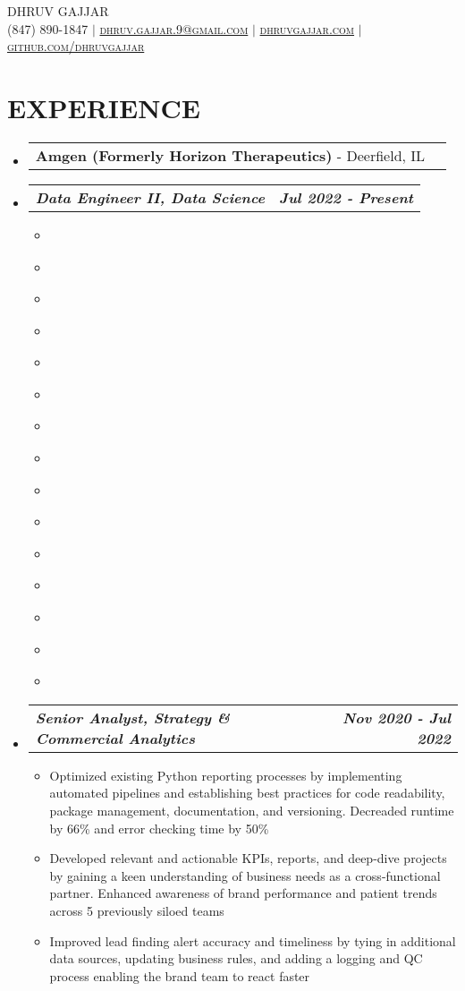 \documentclass[letterpaper,11pt]{article}
\makeatletter
\newcommand{\resumeItem}[1]{
  \item\small{
    {#1 \vspace{-2pt}}
  }
}
\newcommand{\resumeSubheading}[2]{
  \vspace{-2pt}\item
    \begin{tabular*}{0.97\textwidth}[t]{l@{\extracolsep{\fill}}r}
      \textbf{\small#1} - \small#2
    \end{tabular*}\vspace{-13pt}
}
\newcommand{\resumeSubSubheading}[2]{
    \item
    \begin{tabular*}{0.97\textwidth}{l@{\extracolsep{\fill}}r}
      \textbf{\textit{\small#1}} & \textbf{\textit{\small#2}} \\
    \end{tabular*}\vspace{-7pt}
}
\newcommand{\resumeHeadingListStart}{\begin{itemize}[leftmargin=0.05in, label={}]}
\newcommand{\resumeHeadingListEnd}{\end{itemize}}
\newcommand{\resumeSubHeadingListStart}{\begin{itemize}[leftmargin=0.15in, label={}]}
\newcommand{\resumeSubHeadingListEnd}{\end{itemize}\vspace{-10pt}}
\newcommand{\resumeItemListStart}{\begin{itemize}[leftmargin=0.15in]}
\newcommand{\resumeItemListEnd}{\end{itemize}\vspace{-10pt}}
\makeatother
\begin{document}
\thispagestyle{fancy}
\fancyhf{} %
\fancyheadoffset[R]{-0.1cm}

\begin{center}
    \Huge \scshape DHRUV GAJJAR \\ \vspace{1pt}
    \small (847) 890-1847 $|$ 
    \href{mailto:dhruv.gajjar.9@gmail.com}{dhruv.gajjar.9@gmail.com} $|$ 
    \href{https://www.dhruvgajjar.com/}{dhruvgajjar.com} $|$
    \href{https://github.com/dhruvgajjar}{github.com/dhruvgajjar} \\ \vspace{-5pt}
\end{center}


\section{\textbf{EXPERIENCE}}
    \resumeHeadingListStart
      \resumeSubheading{Amgen (Formerly Horizon Therapeutics)}{Deerfield, IL}
    \resumeHeadingListEnd
        \resumeSubHeadingListStart
            \resumeSubSubheading {Data Engineer II, Data Science}{Jul 2022 - Present}
              \resumeItemListStart
                \resumeItem{}
                \resumeItem{}
                \resumeItem{}
                \resumeItem{}
                \resumeItem{}
                \resumeItem{}
                \resumeItem{}
                \resumeItem{}
                \resumeItem{}
                \resumeItem{}
                \resumeItem{}
                \resumeItem{}
                \resumeItem{}
                \resumeItem{}
                \resumeItem{}
              \resumeItemListEnd

            \resumeSubSubheading {Senior Analyst, Strategy \& Commercial Analytics}{Nov 2020 - Jul 2022}
              \resumeItemListStart
                \resumeItem{Optimized existing Python reporting processes by implementing automated pipelines and establishing best practices for code readability, package management, documentation, and versioning. Decreaded runtime by 66\% and error checking time by 50\%}
                \resumeItem{Developed relevant and actionable KPIs, reports, and deep-dive projects by gaining a keen understanding of business needs as a cross-functional partner. Enhanced awareness of brand performance and patient trends across 5 previously siloed teams}
                \resumeItem{Improved lead finding alert accuracy and timeliness by tying in additional data sources, updating business rules, and adding a logging and QC process enabling the brand team to react faster}
              \resumeItemListEnd
        \resumeSubHeadingListEnd
      
\end{document}
